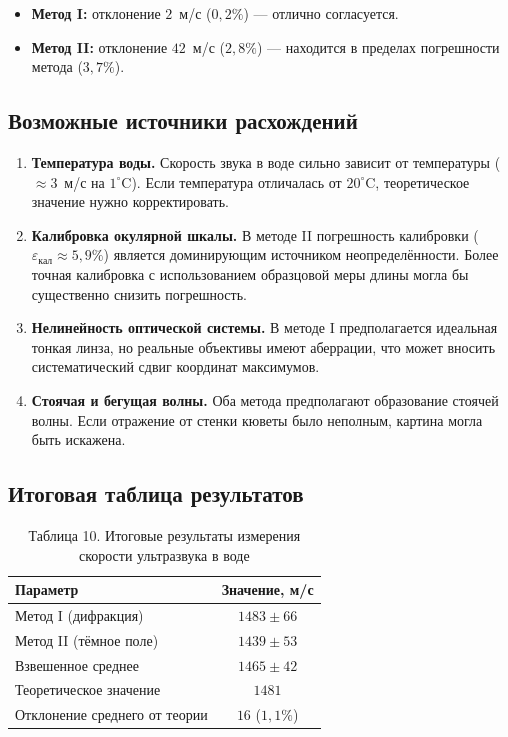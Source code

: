 \documentclass[a4paper]{article}
\begin{document}
\begin{itemize}
    \item \textbf{Метод I:} отклонение $2$~м/с ($0{,}2\%$) — отлично согласуется.
    \item \textbf{Метод II:} отклонение $42$~м/с ($2{,}8\%$) — находится в пределах погрешности метода ($3{,}7\%$).
\end{itemize}

\subsection{Возможные источники расхождений}

\begin{enumerate}
    \item \textbf{Температура воды.} Скорость звука в воде сильно зависит от температуры ($\approx 3$~м/с на $1^\circ$C). Если температура отличалась от $20^\circ$C, теоретическое значение нужно корректировать.
    
    \item \textbf{Калибровка окулярной шкалы.} В методе II погрешность калибровки ($\varepsilon_{\text{кал}} \approx 5{,}9\%$) является доминирующим источником неопределённости. Более точная калибровка с использованием образцовой меры длины могла бы существенно снизить погрешность.
    
    \item \textbf{Нелинейность оптической системы.} В методе I предполагается идеальная тонкая линза, но реальные объективы имеют аберрации, что может вносить систематический сдвиг координат максимумов.
    
    \item \textbf{Стоячая и бегущая волны.} Оба метода предполагают образование стоячей волны. Если отражение от стенки кюветы было неполным, картина могла быть искажена.
\end{enumerate}

\subsection*{Итоговая таблица результатов}

\begin{table}[h!]
\centering

\begin{tabular}{|l|c|}
\hline
Параметр & Значение,  м/с\\
\hline
Метод I (дифракция) & $1483 \pm 66$ \\ \hline
Метод II (тёмное поле) & $1439 \pm 53$ \\ \hline
Взвешенное среднее & $1465 \pm 42$ \\ \hline
Теоретическое значение & $1481$ \\ \hline
Отклонение среднего от теории & $16$ ($1{,}1\%$) \\ \hline
\end{tabular}
\caption{Таблица 10. Итоговые результаты измерения скорости ультразвука в воде}
\label{tab:final}
\end{table}
\end{document}
